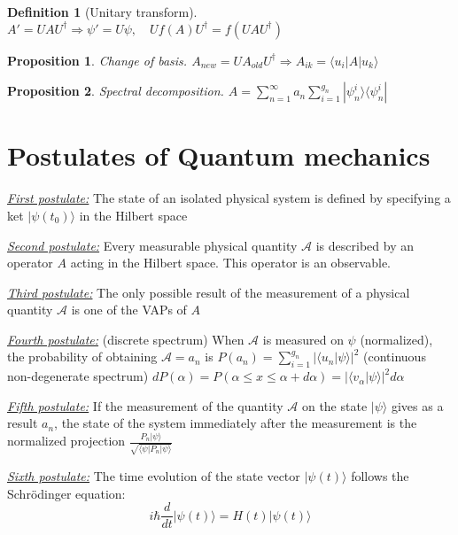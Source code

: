 \documentclass[leqno]{article}
\newtheorem*{proposition}{Proposition}
\newtheorem*{definition}{Definition}
\begin{document}
\begin{definition}[Unitary transform] $A' = UAU^\dagger \Rightarrow \psi ' = U\psi , \quad Uf(A)U^\dagger=f(UAU^\dagger)$
\end{definition}
\begin{proposition}
Change of basis. $A_{new} = U A_{old} U^\dagger \Rightarrow A_{ik}=\langle u_i | A | u_k \rangle $ 
\end{proposition}
\begin{proposition}
  Spectral decomposition. $A = \sum_{n=1}^\infty a_n\sum_{i=1}^{g_n}| \psi _n^i \rangle \langle \psi _n^i | $ 
\end{proposition}

\section{Postulates of Quantum mechanics}
\underline{\textit{First postulate:}} The state of an isolated physical system is defined by specifying a ket $| \psi (t_0) \rangle $ in the Hilbert space

\underline{\textit{Second postulate:}} Every measurable physical quantity $\mathcal{A}$ is described by an operator $A$ acting in the Hilbert space. This operator is an observable.
 
\underline{\textit{Third postulate:}} The only possible result of the measurement of a physical quantity $\mathcal{A}$ is one of the VAPs of $A$

\underline{\textit{Fourth postulate:}} (discrete spectrum) When $\mathcal{A}$ is measured on $\psi $ (normalized), the probability of obtaining $\mathcal{A}=a_n$ is $P(a_n) = \sum_{i=1}^{g_n}|\langle u_n | \psi  \rangle |^2$ (continuous non-degenerate spectrum) $dP(\alpha ) = P(\alpha \le x\le \alpha +d\alpha ) = |\langle v_\alpha  | \psi  \rangle |^2d\alpha $

\underline{\textit{Fifth postulate:}} If the measurement of the quantity $\mathcal{A}$ on the state $| \psi  \rangle $ gives as a result $a_n$, the state of the system immediately after the measurement is the normalized projection $\displaystyle \frac{P_n| \psi  \rangle }{\sqrt{\langle \psi  | P_n | \psi  \rangle } }$ 

\underline{\textit{Sixth postulate:}} The time evolution of the state vector $| \psi (t) \rangle $ follows the Schrödinger equation:
\[
 i\hbar \frac{d }{d t} | \psi (t) \rangle = H(t)| \psi (t) \rangle  
\] 
\end{document}
